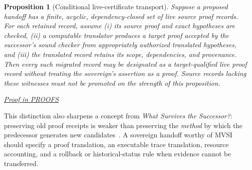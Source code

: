 \documentclass[11pt,letterpaper]{article}
\newtheorem{proposition}[theorem]{Proposition}
\theoremstyle{definition}\newtheorem{definition}[theorem]{Definition}\newtheorem{example}[theorem]{Example}
\theoremstyle{remark}\newtheorem{remark}[theorem]{Remark}
\newcommand{\prooflink}[1]{\par\noindent\hfill\small\hyperref[#1]{\textit{Proof in PROOFS}}\normalsize}
\begin{document}
\begin{proposition}[Conditional live-certificate transport]\label{mvsi:prop:transport}
Suppose a proposed handoff has a finite, acyclic, dependency-closed set of live source proof records. For each retained record, assume (i) its source proof and exact hypotheses are checked, (ii) a computable translator produces a target proof accepted by the successor's sound checker from appropriately authorized translated hypotheses, and (iii) the translated record retains its scope, dependencies, and provenance. Then every such migrated record may be designated as a \emph{target-qualified} live proof record without treating the sovereign's assertion as a proof. Source records lacking these witnesses must not be promoted on the strength of this proposition.
\end{proposition}
\label{br:mvsi:stmt:5}\prooflink{br:mvsi:proof:5}


This distinction also sharpens a concept from \emph{What Survives the Successor?}: preserving old proof receipts is weaker than preserving the \emph{method} by which the predecessor generates new candidates~\cite{mvsi:Successor}. A sovereign handoff worthy of MVSI should specify a proof translation, an executable trace translation, resource accounting, and a rollback or historical-status rule when evidence cannot be transferred.
\end{document}
